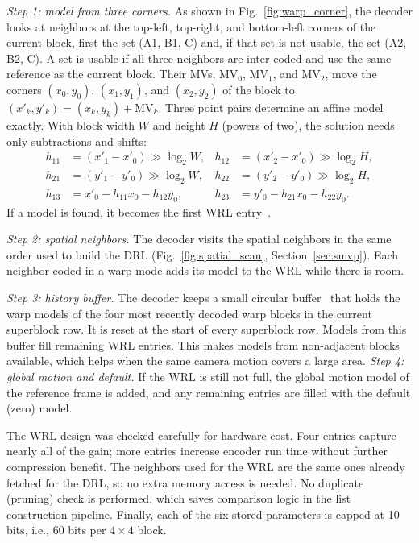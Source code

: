 \documentclass[journal]{IEEEtran}
\begin{document}
\emph{Step 1: model from three corners.} As shown in
Fig.~\ref{fig:warp_corner}, the decoder looks at neighbors at the top-left,
top-right, and bottom-left corners of the current block, first the set
(A1, B1, C) and, if that set is not usable, the set (A2, B2, C). A set is
usable if all three neighbors are inter coded and use the same reference as
the current block. Their MVs, $\mathrm{MV}_0$, $\mathrm{MV}_1$, and
$\mathrm{MV}_2$, move the corners $(x_0,y_0)$, $(x_1,y_1)$, and $(x_2,y_2)$ of
the block to $(x'_k, y'_k) = (x_k,y_k) + \mathrm{MV}_k$. Three point pairs
determine an affine model exactly. With block width $W$ and height $H$
(powers of two), the solution needs only subtractions and shifts:
\begin{align}
  h_{11} &= (x'_1 - x'_0) \gg \log_2 W, &
  h_{12} &= (x'_2 - x'_0) \gg \log_2 H, \label{eq:corner_h11}\\
  h_{21} &= (y'_1 - y'_0) \gg \log_2 W, &
  h_{22} &= (y'_2 - y'_0) \gg \log_2 H, \\
  h_{13} &= x'_0 - h_{11}x_0 - h_{12}y_0, &
  h_{23} &= y'_0 - h_{21}x_0 - h_{22}y_0. \label{eq:corner_h23}
\end{align}
If a model is found, it becomes the first WRL entry~\cite{cwgD067}.

\emph{Step 2: spatial neighbors.} The decoder visits the spatial neighbors
in the same order used to build the DRL (Fig.~\ref{fig:spatial_scan},
Section~\ref{sec:smvp}). Each neighbor coded in a warp mode adds its model to
the WRL while there is room.

\emph{Step 3: history buffer.} The decoder keeps a small circular
buffer~\cite{cwgC087} that
holds the warp models of the four most recently decoded warp blocks in the
current superblock row. It is reset at the start of every superblock row.
Models from this buffer fill remaining WRL entries. This makes models from
non-adjacent blocks available, which helps when the same camera motion covers
a large area.
\emph{Step 4: global motion and default.} If the WRL is still not full, the
global motion model of the reference frame is added, and any remaining
entries are filled with the default (zero) model.

The WRL design was checked carefully for hardware cost. Four entries capture
nearly all of the gain; more entries increase encoder run time without
further compression benefit. The neighbors used for the WRL are the same
ones already fetched for the DRL, so no extra memory access is needed. No
duplicate (pruning) check is performed, which saves comparison logic in the
list construction pipeline. Finally, each of the six stored parameters is
capped at 10 bits, i.e., 60 bits per $4{\times}4$ block.
\end{document}
